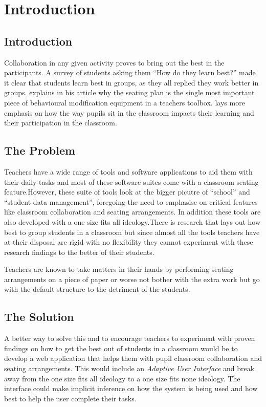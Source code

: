 \section{Introduction}
\subsection{Introduction} 
Collaboration in any given activity proves to bring out the best in the participants. A survey of students asking them ``How do they learn best?'' made it clear that students learn best in groups, as they all replied they work better in groups.\cite{website:TES} explains in his article why the seating plan is the single most important piece of behavioural modification equipment in a teachers toolbox. \cite{website:TES}lays more emphasis on how the way pupils sit in the classroom impacts their learning and their participation in the classroom. 
\subsection{The Problem}
Teachers have a wide range of tools and software applications to aid them with their daily tasks and most of these software suites come with a classroom seating feature.However, these suite of tools look at the bigger picutre of ``school'' and ``student data management'', foregoing the need to emphasise on critical features like classroom collaboration and seating arrangements. In addition these tools are also developed with a one size fits all ideology.There is research that lays out how best to group students in a classroom but since almost all the tools teachers have at their disposal are rigid with no flexibility they cannot experiment with these research findings to the better of their students.

Teachers are known to take matters in their hands by performing seating arrangements on a piece of paper or worse not bother with the extra work but go with the default structure to the detriment of the students.

\subsection{The Solution}
A better way to solve this and to encourage teachers to experiment with proven findings on how to get the best out of students in a classroom would be to develop a web application that helps them with pupil classroom collaboration and seating arrangements. This would include an \emph{Adaptive User Interface} and break away from the one size fits all ideology to a one size fits none ideology. The interface could make implicit inference on how the system is being used and how best to help the user complete their tasks.

